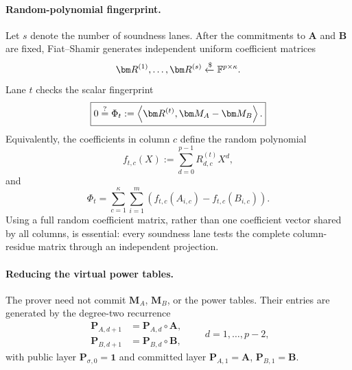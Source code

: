 \documentclass[runningheads]{llncs}
\begin{document}
\paragraph{Random-polynomial fingerprint.}
Let \(s\) denote the number of soundness lanes.  After the commitments
to \(\bm A\) and \(\bm B\) are fixed, Fiat--Shamir generates
independent uniform coefficient matrices
\[
    \bm R^{(1)},\ldots,\bm R^{(s)}
      \ChooseRandom\Field^{p\times\kappa}.
\]
Lane \(t\) checks the scalar fingerprint
\begin{equation}
    \boxed{
    0
      \EqOrNot
      \Phi_t
      :=
      \left\langle
        \bm R^{(t)},\bm M_A-\bm M_B
      \right\rangle.
    }
\label{eq:packed-permutation-random-fingerprint}
\end{equation}
Equivalently, the coefficients in column \(c\) define the random
polynomial
\begin{equation}
    f_{t,c}(X)
      :=
      \sum_{d=0}^{p-1}R^{(t)}_{d,c}X^d,
\label{eq:packed-permutation-random-polynomial}
\end{equation}
and
\begin{equation}
    \Phi_t
      =
      \sum_{c=1}^{\kappa}\sum_{i=1}^{m}
      \left(
        f_{t,c}(A_{i,c})-f_{t,c}(B_{i,c})
      \right).
\label{eq:packed-permutation-polynomial-evaluation}
\end{equation}
Using a full random coefficient matrix, rather than one coefficient
vector shared by all columns, is essential: every soundness lane tests
the complete column-residue matrix through an independent projection.

\paragraph{Reducing the virtual power tables.}
The prover need not commit \(\bm M_A\), \(\bm M_B\), or the power
tables.  Their entries are generated by the degree-two recurrence
\begin{equation}
\begin{aligned}
    \bm P_{A,d+1}&=\bm P_{A,d}\circ\bm A,\\
    \bm P_{B,d+1}&=\bm P_{B,d}\circ\bm B,
\end{aligned}
\qquad d=1,\ldots,p-2,
\label{eq:packed-permutation-power-recurrence}
\end{equation}
with public layer \(\bm P_{\sigma,0}=\bm 1\) and committed layer
\(\bm P_{A,1}=\bm A\), \(\bm P_{B,1}=\bm B\).
\end{document}
